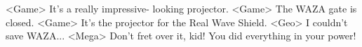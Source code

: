 <Game> It's a really impressive- looking projector. 
<Game> The WAZA gate is closed. 
<Game> It's the projector for the Real Wave Shield. 
<Geo> I couldn't save WAZA... 
<Mega> Don't fret over it, kid! You did everything in your power! 
